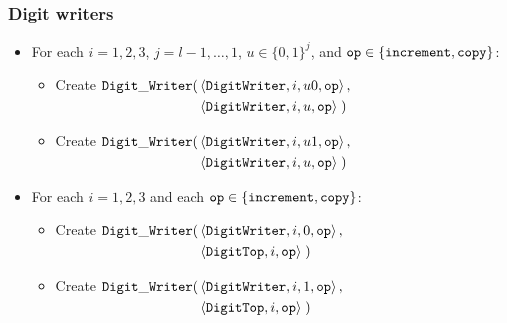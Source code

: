     


    \subsubsection{ Digit writers }

        \begin{itemize}

            \item For each $i = 1,2,3$,
                           $j = l-1,\ldots,1$,
                           $u \in \{0, 1\}^j$, and
                           ${\tt op} \in \{{\tt increment}, {\tt copy} \}$:
                \begin{itemize}
                \item Create
                    $\begin{aligned}[t]
                        {\tt Digit\_Writer}(& \left\langle {\tt DigitWriter}, i, u0, {\tt op} \right\rangle, \\
                                & \left\langle {\tt DigitWriter},  i, u,  {\tt op} \right\rangle \;)
                    \end{aligned}$

                \item Create
                $\begin{aligned}[t]
                    {\tt Digit\_Writer}(& \left\langle {\tt DigitWriter},    i,  u1, {\tt op} \right\rangle, \\
                                & \left\langle {\tt DigitWriter}, i,  u,  {\tt op} \right\rangle \;)
                \end{aligned}$

                \end{itemize}

            \item For each $i = 1,2,3$ and each ${\tt op} \in \{{\tt increment}, {\tt copy} \}$:
            \begin{itemize}
                \item Create
                    $\begin{aligned}[t]
                        {\tt Digit\_Writer}(& \left\langle {\tt DigitWriter}, i, 0, {\tt op} \right\rangle, \\
                                 & \left\langle {\tt DigitTop}, i, {\tt op} \right\rangle \;)
                    \end{aligned}$

                \item Create
                $\begin{aligned}[t]
                    {\tt Digit\_Writer}(& \left\langle {\tt DigitWriter}, i, 1, {\tt op}\right\rangle, \\
                             & \left\langle {\tt DigitTop},    i,    {\tt op}\right\rangle \;)
                \end{aligned}$
                \end{itemize}


        \end{itemize}

